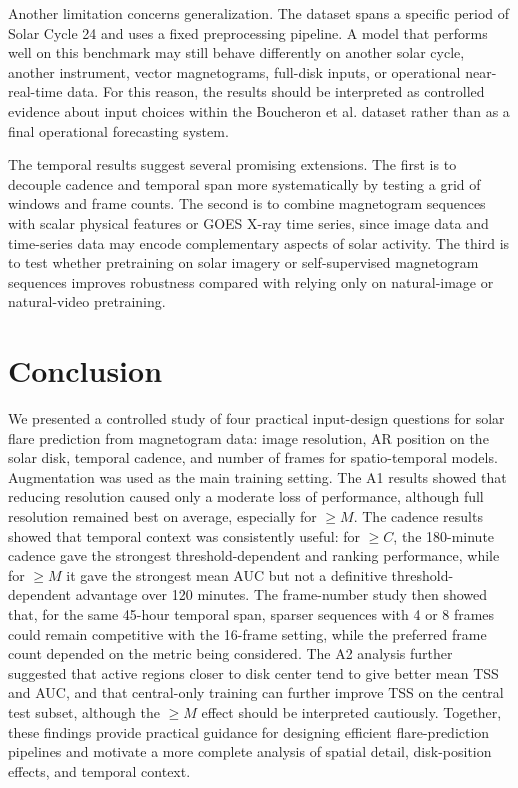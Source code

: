 Another limitation concerns generalization. The dataset spans a specific period of Solar Cycle 24 and uses a fixed preprocessing pipeline. A model that performs well on this benchmark may still behave differently on another solar cycle, another instrument, vector magnetograms, full-disk inputs, or operational near-real-time data. For this reason, the results should be interpreted as controlled evidence about input choices within the Boucheron et al. dataset rather than as a final operational forecasting system.

The temporal results suggest several promising extensions. The first is to decouple cadence and temporal span more systematically by testing a grid of windows and frame counts. The second is to combine magnetogram sequences with scalar physical features or GOES X-ray time series, since image data and time-series data may encode complementary aspects of solar activity. The third is to test whether pretraining on solar imagery or self-supervised magnetogram sequences improves robustness compared with relying only on natural-image or natural-video pretraining.

\section{Conclusion}

We presented a controlled study of four practical input-design questions for solar flare prediction from magnetogram data: image resolution, AR position on the solar disk, temporal cadence, and number of frames for spatio-temporal models. Augmentation was used as the main training setting. The A1 results showed that reducing resolution caused only a moderate loss of performance, although full resolution remained best on average, especially for $\geq M$. The cadence results showed that temporal context was consistently useful: for $\geq C$, the 180-minute cadence gave the strongest threshold-dependent and ranking performance, while for $\geq M$ it gave the strongest mean AUC but not a definitive threshold-dependent advantage over 120 minutes. The frame-number study then showed that, for the same 45-hour temporal span, sparser sequences with 4 or 8 frames could remain competitive with the 16-frame setting, while the preferred frame count depended on the metric being considered. The A2 analysis further suggested that active regions closer to disk center tend to give better mean TSS and AUC, and that central-only training can further improve TSS on the central test subset, although the $\geq M$ effect should be interpreted cautiously. Together, these findings provide practical guidance for designing efficient flare-prediction pipelines and motivate a more complete analysis of spatial detail, disk-position effects, and temporal context.

\endinput
